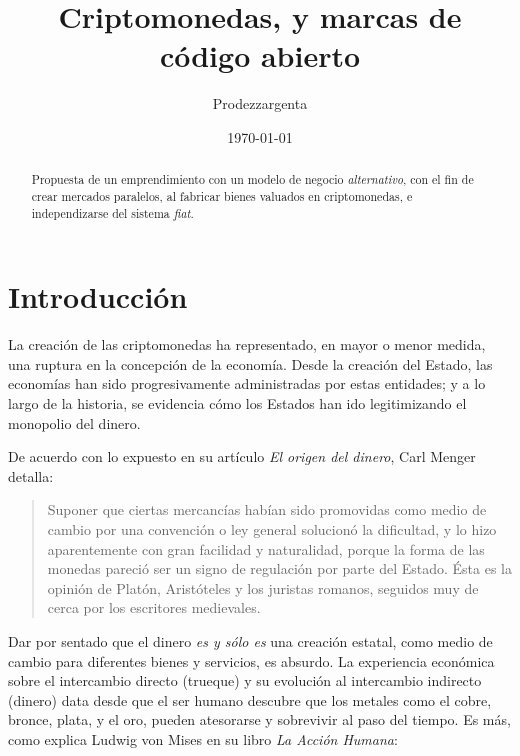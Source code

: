 \documentclass[12pt,a4paper]{article}
\author{Prodezzargenta}
\title{Criptomonedas, y marcas de código abierto}
\date{\today}
\begin{document}
\maketitle

\begin{abstract}
Propuesta de un emprendimiento con un modelo de negocio \textit{alternativo}, con el fin de crear mercados paralelos, al fabricar bienes valuados en criptomonedas, e independizarse del sistema \textit{fiat}.
\end{abstract}
	
\tableofcontents

\section{Introducción}
La creación de las criptomonedas ha representado, en mayor o menor medida, una ruptura en la concepción de la economía. Desde la creación del Estado, las economías han sido progresivamente administradas por estas entidades; y a lo largo de la historia, se evidencia cómo los Estados han ido legitimizando el monopolio del dinero.

De acuerdo con lo expuesto en su artículo \textit{El origen del dinero}, Carl Menger detalla:

\begin{quotation}
Suponer que ciertas mercancías habían sido promovidas como medio de cambio por una convención o ley general solucionó la dificultad, y lo hizo aparentemente con gran facilidad y naturalidad, porque la forma de las monedas pareció ser un signo de regulación por parte del Estado. Ésta es la opinión de Platón, Aristóteles y los juristas romanos, seguidos muy de cerca por los escritores medievales. \cite[págs. 240-241]{menger:origen}
\end{quotation}

Dar por sentado que el dinero \textit{es y sólo es} una creación estatal, como medio de cambio para diferentes bienes y servicios, es absurdo. La experiencia económica sobre el intercambio directo (trueque) y su evolución al intercambio indirecto (dinero) data desde que el ser humano descubre que los metales como el cobre, bronce, plata, y el oro, pueden atesorarse y sobrevivir al paso del tiempo. Es más, como explica Ludwig von Mises en su libro \textit{La Acción Humana}:
\end{document}

